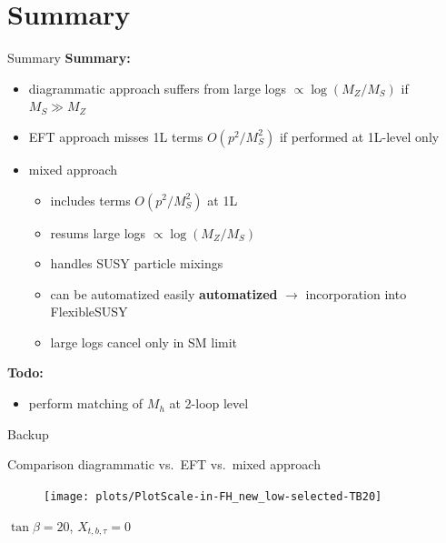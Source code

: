 \documentclass[hyperref={pdfpagelabels=false},ngerman]{beamer}
\renewcommand{\emph}{\textbf}
\begin{document}

\section{Summary}

\begin{frame}{Summary}
  \emph{Summary:}
  \begin{itemize}
  \item diagrammatic approach suffers from large logs
    $\propto\log(M_Z/M_S)$ if $M_S \gg M_Z$
  \item EFT approach misses 1L terms $O(p^2/M_S^2)$ if performed at
    1L-level only
  \item mixed approach
    \begin{itemize}
    \item includes terms $O(p^2/M_S^2)$ at 1L
    \item resums large logs $\propto\log(M_Z/M_S)$
    \item handles SUSY particle mixings
    \item can be automatized easily \emph{automatized} $\rightarrow$
      incorporation into FlexibleSUSY
    \item large logs cancel only in SM limit
    \end{itemize}
  \end{itemize}
  \emph{Todo:}
  \begin{itemize}
  \item perform matching of $M_h$ at 2-loop level
  \end{itemize}
\end{frame}


\begin{frame}[noframenumbering]
  \begin{center}
    \Huge Backup
  \end{center}
\end{frame}

\begin{frame}[noframenumbering]{Comparison diagrammatic vs.\ EFT vs.\ mixed approach}
  \begin{figure}
    \centering
    \texttt{[image: plots/PlotScale-in-FH\_new\_low-selected-TB20]}
  \end{figure}
  $\tan\beta = 20$, $X_{t,b,\tau} = 0$
\end{frame}
\end{document}
